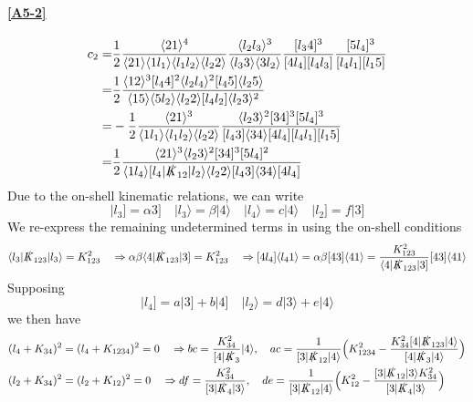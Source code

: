\paragraph{\ref{A5-2}}
%
\begin{equation*}
\begin{split}
c_2  = &
\frac{1}{2}\frac{\langle 21\rangle^4}{\langle 21 \rangle\langle 1l_1\rangle\langle l_1l_2\rangle\langle l_2 2\rangle}
\frac{\langle l_2 l_3\rangle^3}{\langle l_3 3\rangle\langle 3 l_2\rangle}
\frac{[l_3 4]^3}{[4l_4][l_4 l_3]}
\frac{[5 l_4]^3}{[l_4 l_1][l_1 5]}
\\
= &
\frac{1}{2}\frac{\langle 12 \rangle^3[l_4 4 ]^2\langle l_2l_4\rangle^2 [l_4 5]\langle l_2 5\rangle}{\langle 15\rangle\langle 5 l_2 \rangle\langle l_2 2\rangle[l_4 l_2]\langle l_2 3\rangle^2
}
\\
= &
-\frac{1}{2}\frac{\langle 21 \rangle^3}{\langle 1 l_1 \rangle\langle l_1 l_2 \rangle\langle l_2 2 \rangle}
\frac{\langle l_2 3 \rangle^2[34]^3[5l_4]^3}{[l_4 3]\langle 3 4 \rangle [4 l_4][l_4 l_1][l_1 5]}
\\
= & 
\frac{1}{2}
\frac{\langle 21 \rangle^3 \langle l_2 3 \rangle^2 [34]^3 [5l_4]^2}{\langle 1 l_4 \rangle [l_4|\slashed{K}_{12}|l_2\rangle\langle l_2 2 \rangle [l_4 3]\langle 34 \rangle [4l_4]}
\end{split}
\end{equation*}
Due to the on-shell kinematic relations, we can write
\begin{equation*}
|l_3] = \alpha 3] \quad
|l_3\rangle = \beta |4\rangle \quad
|l_4\rangle = c|4\rangle \quad
|l_2] = f |3]
\end{equation*}
We re-express the remaining undetermined terms in using the on-shell conditions
\begin{equation*}
\langle l_3|\slashed{K}_{123}|l_3\rangle = K_{123}^2 \quad\Rightarrow
\alpha\beta \langle 4 | \slashed{K}_{123}|3] = K_{123}^2
\quad\Rightarrow
[4l_4]\langle l_4 1 \rangle = \alpha\beta [43]\langle 41 \rangle
=\frac{K_{123}^2}{\langle 4 |\slashed{K}_{123}|3]}[43]\langle 4 1 \rangle
\end{equation*}
Supposing
\begin{equation*}
|l_4] = a|3] + b|4] \quad
|l_2\rangle = d|3\rangle + e|4\rangle
\end{equation*}
we then have
\begin{equation*}
\begin{split}
&
(l_4 + K_{34})^2 = (l_4 + K_{1234})^2 = 0
\quad\Rightarrow
bc = \frac{K_{34}^2}{[4|\slashed{K}_3}|4\rangle
,\quad
ac = \frac{1}{[3|\slashed{K}_{12}|4\rangle}\Big(K_{1234}^2 - \frac{K_{34}^2 [4|\slashed{K}_{123}|4\rangle}{[4|\slashed{K}_3|4\rangle}\Big)
\\
&
(l_2 + K_{34} )^2 = (l_2 + K_{12})^2= 0 \quad\Rightarrow
df = \frac{K_{34}^2}{[3|\slashed{K}_4|3\rangle}
,\quad
de = \frac{1}{[3 | \slashed{K}_{12}|4\rangle}\Big(K_{12}^2 - \frac{[3|\slashed{K}_{12}|3\rangle K_{34}^2}{[3|\slashed{K}_4|3\rangle}\Big)
\end{split}
\end{equation*}
